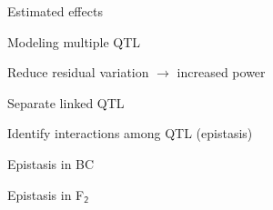 \documentclass[aspectratio=169,12pt,t]{beamer}
\begin{document}
\begin{frame}{Estimated effects}


\end{frame}






\begin{frame}{Modeling multiple QTL}

\bbi
\item Reduce residual variation $\longrightarrow$ increased power
\item Separate linked QTL
\item Identify interactions among QTL {\lolit (epistasis)}
\ei
\end{frame}






\begin{frame}[c]{Epistasis in BC}


\end{frame}






\begin{frame}[c]{Epistasis in F$_{\mathsf{2}}$}


\end{frame}
\end{document}
